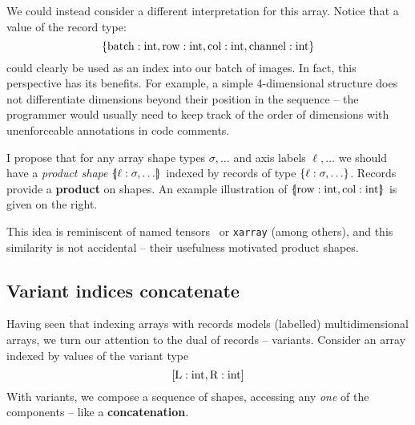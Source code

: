 We could instead consider a different interpretation for this array. Notice that a value of the record type:
$$ \srecordtype{ \mathrm{batch}: \sint, \mathrm{row}: \sint, \mathrm{col}: \sint, \mathrm{channel}: \sint } $$
could clearly be used as an index into our batch of images. In fact, this perspective has its benefits. For example, a simple 4-dimensional structure does not differentiate dimensions beyond their position in the sequence -- the programmer would usually need to keep track of the order of dimensions with \eg{} unenforceable annotations in code comments. 

\begin{wrapfigure}[6]{r}{2.5cm}
\vspace{-0.7cm}
\begin{center}
\end{center}
\end{wrapfigure}

I propose that for any array shape types $\sigma, \dots$ and axis labels $\ell, \dots$ we should have a \textit{product shape} $\sproducttype{\ell : \sigma, \dots}$ indexed by records of type $\srecordtype{\ell : \sigma, \dots}$.
Records provide a \textbf{product} on shapes. 
An example illustration of $\sproducttype{\mathrm{row}: \sint, \mathrm{col}: \sint}$ is given on the right.

This idea is reminiscent of named tensors~\cite{named-tensors} or \texttt{xarray} \cite{hoyer2017xarray} (among others), and this similarity is not accidental -- their usefulness motivated product shapes.

\subsection{Variant indices concatenate}

Having seen that indexing arrays with records models (labelled) multidimensional arrays, we turn our attention to the dual of records -- variants. 
Consider an array
indexed by values of the variant type
$$\svarianttype{\mathrm{L} : \sint, \mathrm{R} : \sint}$$
With variants, we compose a sequence of shapes, accessing any \textit{one} of the components -- like a \textbf{concatenation}. 

